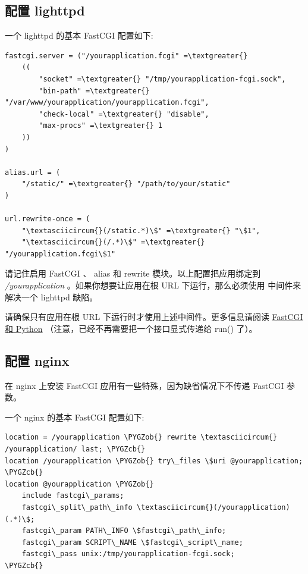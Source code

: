 \documentclass[a4paper,12pt]{sphinxmanual}
\def\PYGZob{\char`\{}
\def\PYGZcb{\char`\}}
\begin{document}
\subsection{配置 lighttpd}
\label{deploying/fastcgi:lighttpd}
一个 lighttpd 的基本 FastCGI 配置如下:

\begin{Verbatim}[commandchars=\\\{\}]
fastcgi.server = ("/yourapplication.fcgi" =\textgreater{}
    ((
        "socket" =\textgreater{} "/tmp/yourapplication-fcgi.sock",
        "bin-path" =\textgreater{} "/var/www/yourapplication/yourapplication.fcgi",
        "check-local" =\textgreater{} "disable",
        "max-procs" =\textgreater{} 1
    ))
)

alias.url = (
    "/static/" =\textgreater{} "/path/to/your/static"
)

url.rewrite-once = (
    "\textasciicircum{}(/static.*)\$" =\textgreater{} "\$1",
    "\textasciicircum{}(/.*)\$" =\textgreater{} "/yourapplication.fcgi\$1"
\end{Verbatim}

请记住启用 FastCGI 、 alias 和 rewrite 模块。以上配置把应用绑定到
\emph{/yourapplication} 。如果你想要让应用在根 URL 下运行，那么必须使用
\href{http://werkzeug.pocoo.org/docs/contrib/fixers/\#werkzeug.contrib.fixers.LighttpdCGIRootFix}{} 中间件来解决一个
lighttpd 缺陷。

请确保只有应用在根 URL 下运行时才使用上述中间件。更多信息请阅读 \href{http://redmine.lighttpd.net/wiki/lighttpd/Docs:ModFastCGI}{FastCGI 和
Python}
（注意，已经不再需要把一个接口显式传递给 run() 了）。


\subsection{配置 nginx}
\label{deploying/fastcgi:nginx}
在 nginx 上安装 FastCGI 应用有一些特殊，因为缺省情况下不传递 FastCGI 参数。

一个 nginx 的基本 FastCGI 配置如下:

\begin{Verbatim}[commandchars=\\\{\}]
location = /yourapplication \PYGZob{} rewrite \textasciicircum{} /yourapplication/ last; \PYGZcb{}
location /yourapplication \PYGZob{} try\_files \$uri @yourapplication; \PYGZcb{}
location @yourapplication \PYGZob{}
    include fastcgi\_params;
    fastcgi\_split\_path\_info \textasciicircum{}(/yourapplication)(.*)\$;
    fastcgi\_param PATH\_INFO \$fastcgi\_path\_info;
    fastcgi\_param SCRIPT\_NAME \$fastcgi\_script\_name;
    fastcgi\_pass unix:/tmp/yourapplication-fcgi.sock;
\PYGZcb{}
\end{Verbatim}
\end{document}
